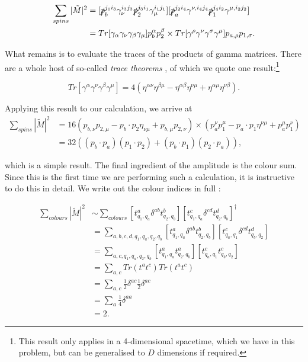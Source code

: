 \begin{equation}
\begin{split}
\sum_{spins}|\tilde{M}|^2  & =  [\slashed{p}_b^{j_1 i_3} \gamma_\nu^{i_3 j_3} \slashed{p}_2^{j_3 i_1} \gamma_\mu^{i_1 j_1}][\slashed{p}_a^{j_2 i_4} \gamma^{\nu,i_4 j_4} \slashed{p}_1^{j_4 i_2} \gamma^{\mu,i_2 j_2}] \\
&= Tr[\gamma_\alpha \gamma_\nu \gamma_\beta \gamma_\mu]p_b^\alpha p_2^\beta \times Tr[\gamma^\rho \gamma^\nu \gamma^\sigma \gamma^\mu] p_{a, \rho} p_{1, \sigma}.
\end{split}
\end{equation}

What remains is to evaluate the traces of the products of gamma matrices. There are a whole host of so-called \emph{trace theorems} \cite{Peskin1995}, of which we quote one result:\footnote{This result only applies in a 4-dimensional spacetime, which we have in this problem, but can be generalised to $D$ dimensions if required.}

\begin{equation}
Tr[\gamma^\alpha \gamma^\nu \gamma^\beta \gamma^\mu] = 4(\eta^{\alpha \nu} \eta^{\beta \mu} - \eta^{\alpha \beta} \eta^{\nu \mu} + \eta^{\alpha \mu} \eta^{\nu \beta}).
\end{equation}

Applying this result to our calculation, we arrive at
\begin{equation}
\begin{split}
\sum_{spins}|\tilde{M}|^2 &= 16 (p_{b, \nu} p_{2, \mu} - p_b \cdot p_2 \eta_{\nu \mu} + p_{b, \mu} p_{2, \nu}) \times (p_a^\nu p_1^\mu - p_a \cdot p_1 \eta^{\nu \mu} + p_a^\mu p_1^\nu) \\
&= 32 \left((p_b \cdot p_a)(p_1 \cdot p_2) + (p_b \cdot p_1)(p_2 \cdot p_a) \right),
\end{split}
\end{equation}

which is a simple result. The final ingredient of the amplitude is the colour sum. Since this is the first time we are performing such a calculation, it is instructive to do this in detail. We write out the colour indices in full \cite{Skands2011}:

\begin{equation}
\begin{split}
\sum_{colours} |\tilde{M}|^2 & \sim \sum_{colours} [t^a_{q_1, q_a} \delta^{ab} t^b_{q_2, q_b}] [t^c_{q_1,q_a} \delta^{cd} t^d_{q_2, q_b}]^\dagger \\
&= \sum_{a,b,c,d,q_1,q_a,q_2,q_b} [t^a_{q_1, q_a} \delta^{ab} t^b_{q_2, q_b}] [t^c_{q_a,q_1} \delta^{cd} t^d_{q_b, q_2}] \\
&= \sum_{a,c,q_1,q_a,q_2,q_b} [t^a_{q_1, q_a} t^a_{q_2, q_b}] [t^c_{q_a,q_1} t^c_{q_b, q_2}] \\
&= \sum_{a,c} Tr(t^a t^c) Tr(t^a t^c) \\
&= \sum_{a,c} \frac{1}{2} \delta^{ac} \frac{1}{2} \delta^{ac} \\
&= \sum_a \frac{1}{4} \delta^{aa} \\
&= 2.
\end{split}
\end{equation}

